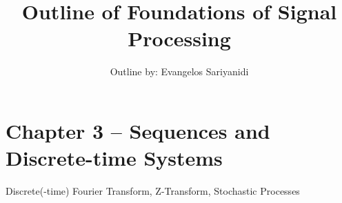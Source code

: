 \documentclass{article}
\begin{document}
\author{Outline by: Evangelos Sariyanidi}

\title{\bf Outline of Foundations of Signal Processing}
\maketitle
\section*{Chapter 3 -- Sequences and Discrete-time Systems}
Discrete(-time) Fourier Transform, Z-Transform, Stochastic Processes

\begin{itemize}


\end{itemize}
\end{document}
